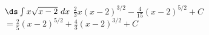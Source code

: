 {$\ds \int x\sqrt{x-2}\ dx$}
{$\frac{2}{3}x(x-2)^{3/2}-\frac{4}{15}(x-2)^{5/2}+C$ $=\frac{2}{5}(x-2)^{5/2}+\frac{4}{3} (x-2)^{3/2}+C$
}

